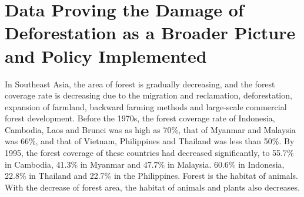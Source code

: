 \documentclass{book}\usepackage{knitr}
\begin{document}
\section{Data Proving the Damage of Deforestation as a Broader Picture and Policy Implemented}
In Southeast Asia, the area of forest is gradually decreasing, and the forest coverage rate is decreasing due to the migration and reclamation, deforestation, expansion of farmland, backward farming methods and large-scale commercial forest development. Before the 1970s, the forest coverage rate of Indonesia, Cambodia, Laos and Brunei was as high as 70\%, that of Myanmar and Malaysia was 66\%, and that of Vietnam, Philippines and Thailand was less than 50\%. By 1995, the forest coverage of these countries had decreased significantly, to 55.7\% in Cambodia, 41.3\% in Myanmar and 47.7\% in Malaysia. 60.6\% in Indonesia, 22.8\% in Thailand and 22.7\% in the Philippines. Forest is the habitat of animals. With the decrease of forest area, the habitat of animals and plants also decreases.
\end{document}
